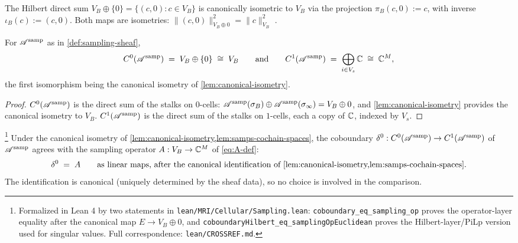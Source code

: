 \begin{lemma}\label{lem:canonical-isometry}
The Hilbert direct sum $V_B \oplus \{0\} = \{(c, 0) : c \in V_B\}$
is canonically isometric to $V_B$ via the projection
$\pi_B(c, 0) := c$, with inverse $\iota_B(c) := (c, 0)$. Both maps
are isometries:
$\lVert (c, 0) \rVert^2_{V_B \oplus 0} = \lVert c \rVert^2_{V_B}$
\cite[\S II.1]{ReedSimonI}.
\end{lemma}

\begin{lemma}\label{lem:samps-cochain-spaces}
For $\mathscr{A}^{\mathrm{samp}}$ as in \cref{def:sampling-sheaf},
\[
  C^0(\mathscr{A}^{\mathrm{samp}}) \;=\; V_B \oplus \{0\} \;\cong\; V_B
  \qquad \text{and} \qquad
  C^1(\mathscr{A}^{\mathrm{samp}}) \;=\; \bigoplus_{i \in V_s} \mathbb{C} \;\cong\; \mathbb{C}^M,
\]
the first isomorphism being the canonical isometry of
\cref{lem:canonical-isometry}.
\end{lemma}

\begin{proof}
$C^0(\mathscr{A}^{\mathrm{samp}})$ is the direct sum of the stalks on $0$-cells:
$\mathscr{A}^{\mathrm{samp}}(\sigma_B) \oplus \mathscr{A}^{\mathrm{samp}}(\sigma_\infty) = V_B \oplus 0$, and
\cref{lem:canonical-isometry} provides the canonical isometry to
$V_B$. $C^1(\mathscr{A}^{\mathrm{samp}})$ is the direct sum of the stalks on $1$-cells,
each a copy of $\mathbb{C}$, indexed by $V_s$.
\end{proof}

\begin{proposition}\label{prop:delta-equals-A}\footnote{Formalized in Lean 4 by two statements in \texttt{lean/MRI/Cellular/Sampling.lean}: \texttt{coboundary\_eq\_sampling\_op} proves the operator-layer equality after the canonical map $E \to V_B \oplus 0$, and \texttt{coboundaryHilbert\_eq\_samplingOpEuclidean} proves the Hilbert-layer/PiLp version used for singular values. Full correspondence: \texttt{lean/CROSSREF.md}.}
Under the canonical isometry of
\cref{lem:canonical-isometry,lem:samps-cochain-spaces}, the
coboundary $\delta^0 : C^0(\mathscr{A}^{\mathrm{samp}}) \to C^1(\mathscr{A}^{\mathrm{samp}})$ of $\mathscr{A}^{\mathrm{samp}}$
agrees with the sampling operator $A : V_B \to \mathbb{C}^M$ of
\cref{eq:A-def}:
\begin{equation}\label{eq:delta0-equals-A}
  \delta^0 \;=\; A \qquad
  \text{as linear maps, after the canonical identification of
        \cref{lem:canonical-isometry,lem:samps-cochain-spaces}.}
\end{equation}
The identification is canonical (uniquely determined by the
sheaf data), so no choice is involved in the comparison.
\end{proposition}

